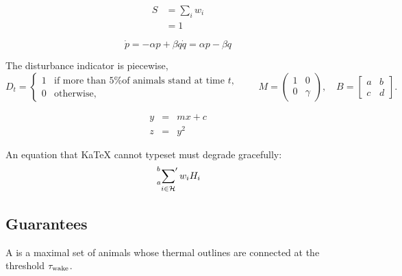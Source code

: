 \begin{equation}
\begin{split}
  S &= \sum_{i} w_i \\
    &= 1
\end{split}
\end{equation}

\begin{subequations}\label{eq:pair}
\begin{equation}
  \dot{p} = -\alpha p + \beta q
\end{equation}
\begin{equation}
  \dot{q} = \alpha p - \beta q
\end{equation}
\end{subequations}

The disturbance indicator is piecewise,
\begin{equation}
  D_t = \begin{cases}
    1 & \text{if more than 5\% of animals stand at time } t, \\
    0 & \text{otherwise,}
  \end{cases}
  \qquad
  M = \begin{pmatrix} 1 & 0 \\ 0 & \gamma \end{pmatrix},
  \quad
  B = \begin{bmatrix} a & b \\ c & d \end{bmatrix} .
\end{equation}

\begin{eqnarray}
  y &=& m x + c \\
  z &=& y^2
\end{eqnarray}

An equation that KaTeX cannot typeset must degrade gracefully:
\begin{equation}
  \sideset{_a^b}{'}{\sum}_{i \in \mathcal{H}} w_i H_i
\end{equation}

\subsection{Guarantees}

\begin{definition}[Huddle]\label{def:huddle}
A  is a maximal set of animals whose thermal outlines are connected at the threshold $\tau_{\mathrm{wake}}$.
\end{definition}

